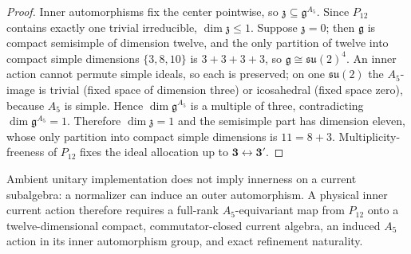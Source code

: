 \documentclass[11pt]{article}
\begin{document}
\begin{proof}
Inner automorphisms fix the center pointwise, so
\(\mathfrak z\subseteq\mathfrak g^{A_5}\). Since \(P_{12}\) contains exactly one
trivial irreducible, \(\dim\mathfrak z\le1\). Suppose \(\mathfrak z=0\); then
\(\mathfrak g\) is compact semisimple of dimension twelve, and the only
partition of twelve into compact simple dimensions \(\{3,8,10\}\) is
\(3+3+3+3\), so \(\mathfrak g\cong\mathfrak{su}(2)^4\). An inner action cannot
permute simple ideals, so each is preserved; on one \(\mathfrak{su}(2)\) the
\(A_5\)-image is trivial (fixed space of dimension three) or icosahedral (fixed
space zero), because \(A_5\) is simple. Hence \(\dim\mathfrak g^{A_5}\) is a
multiple of three, contradicting \(\dim\mathfrak g^{A_5}=1\). Therefore
\(\dim\mathfrak z=1\) and the semisimple part has dimension eleven, whose only
partition into compact simple dimensions is \(11=8+3\). Multiplicity-freeness
of \(P_{12}\) fixes the ideal allocation up to
\(\mathbf3\leftrightarrow\mathbf3'\).
\end{proof}

Ambient unitary implementation does not imply innerness on a current
subalgebra: a normalizer can induce an outer automorphism. A physical inner
current action therefore requires a full-rank
\(A_5\)-equivariant map from \(P_{12}\) onto a twelve-dimensional compact,
commutator-closed current algebra, an induced \(A_5\) action in its inner
automorphism group, and exact refinement naturality.
\end{document}
